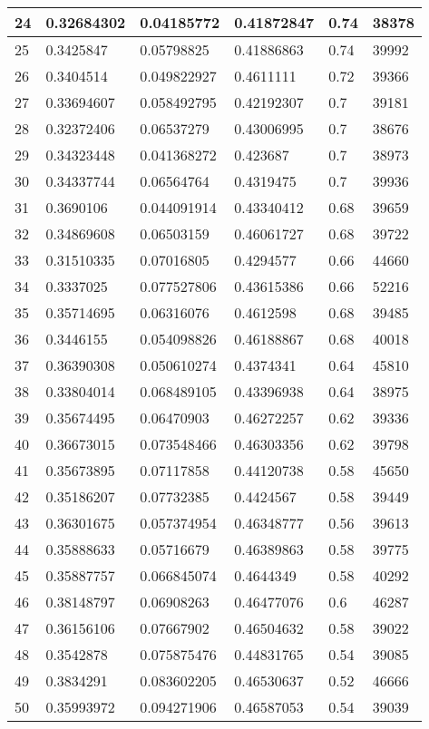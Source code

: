 \begin{longtable}{|l|l|l|l|l|l|}
24 & 0.32684302 & 0.04185772 & 0.41872847 & 0.74 & 38378 \\ \hline 
25 & 0.3425847 & 0.05798825 & 0.41886863 & 0.74 & 39992 \\ \hline 
26 & 0.3404514 & 0.049822927 & 0.4611111 & 0.72 & 39366 \\ \hline 
27 & 0.33694607 & 0.058492795 & 0.42192307 & 0.7 & 39181 \\ \hline 
28 & 0.32372406 & 0.06537279 & 0.43006995 & 0.7 & 38676 \\ \hline 
29 & 0.34323448 & 0.041368272 & 0.423687 & 0.7 & 38973 \\ \hline 
30 & 0.34337744 & 0.06564764 & 0.4319475 & 0.7 & 39936 \\ \hline 
31 & 0.3690106 & 0.044091914 & 0.43340412 & 0.68 & 39659 \\ \hline 
32 & 0.34869608 & 0.06503159 & 0.46061727 & 0.68 & 39722 \\ \hline 
33 & 0.31510335 & 0.07016805 & 0.4294577 & 0.66 & 44660 \\ \hline 
34 & 0.3337025 & 0.077527806 & 0.43615386 & 0.66 & 52216 \\ \hline 
35 & 0.35714695 & 0.06316076 & 0.4612598 & 0.68 & 39485 \\ \hline 
36 & 0.3446155 & 0.054098826 & 0.46188867 & 0.68 & 40018 \\ \hline 
37 & 0.36390308 & 0.050610274 & 0.4374341 & 0.64 & 45810 \\ \hline 
38 & 0.33804014 & 0.068489105 & 0.43396938 & 0.64 & 38975 \\ \hline 
39 & 0.35674495 & 0.06470903 & 0.46272257 & 0.62 & 39336 \\ \hline 
40 & 0.36673015 & 0.073548466 & 0.46303356 & 0.62 & 39798 \\ \hline 
41 & 0.35673895 & 0.07117858 & 0.44120738 & 0.58 & 45650 \\ \hline 
42 & 0.35186207 & 0.07732385 & 0.4424567 & 0.58 & 39449 \\ \hline 
43 & 0.36301675 & 0.057374954 & 0.46348777 & 0.56 & 39613 \\ \hline 
44 & 0.35888633 & 0.05716679 & 0.46389863 & 0.58 & 39775 \\ \hline 
45 & 0.35887757 & 0.066845074 & 0.4644349 & 0.58 & 40292 \\ \hline 
46 & 0.38148797 & 0.06908263 & 0.46477076 & 0.6 & 46287 \\ \hline 
47 & 0.36156106 & 0.07667902 & 0.46504632 & 0.58 & 39022 \\ \hline 
48 & 0.3542878 & 0.075875476 & 0.44831765 & 0.54 & 39085 \\ \hline 
49 & 0.3834291 & 0.083602205 & 0.46530637 & 0.52 & 46666 \\ \hline 
50 & 0.35993972 & 0.094271906 & 0.46587053 & 0.54 & 39039 \\ \hline 
\end{longtable}